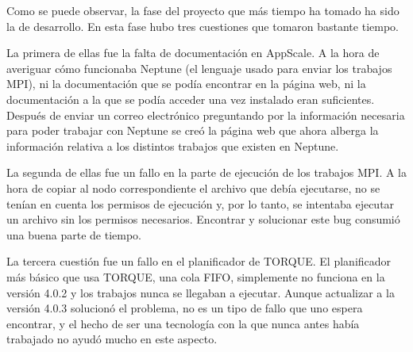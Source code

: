 Como se puede observar, la fase del proyecto que más tiempo ha tomado ha sido la de desarrollo. En esta fase hubo tres cuestiones que tomaron bastante tiempo.

La primera de ellas fue la falta de documentación en AppScale. A la hora de averiguar cómo funcionaba Neptune (el lenguaje usado para enviar los trabajos MPI), ni la documentación que se podía encontrar en la página web, ni la documentación a la que se podía acceder una vez instalado eran suficientes. Después de enviar un correo electrónico preguntando por la información necesaria para poder trabajar con Neptune se creó la página web que ahora alberga la información relativa a los distintos trabajos que existen en Neptune.

La segunda de ellas fue un fallo en la parte de ejecución de los trabajos MPI. A la hora de copiar al nodo correspondiente el archivo que debía ejecutarse, no se tenían en cuenta los permisos de ejecución y, por lo tanto, se intentaba ejecutar un archivo sin los permisos necesarios. Encontrar y solucionar este bug consumió una buena parte de tiempo.

La tercera cuestión fue un fallo en el planificador de TORQUE. El planificador más básico que usa TORQUE, una cola FIFO, simplemente no funciona en la versión 4.0.2 y los trabajos nunca se llegaban a ejecutar. Aunque actualizar a la versión 4.0.3 solucionó el problema, no es un tipo de fallo que uno espera encontrar, y el hecho de ser una tecnología con la que nunca antes había trabajado no ayudó mucho en este aspecto.
